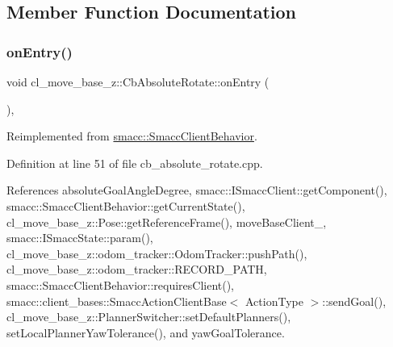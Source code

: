 \subsection{Member Function Documentation}
\mbox{\label{classcl__move__base__z_1_1CbAbsoluteRotate_a10418ea360809fa649d295716b152b2b}} 
\subsubsection{\texorpdfstring{on\+Entry()}{onEntry()}}
{\footnotesize\ttfamily void cl\+\_\+move\+\_\+base\+\_\+z\+::\+Cb\+Absolute\+Rotate\+::on\+Entry (\begin{DoxyParamCaption}{ }\end{DoxyParamCaption})\hspace{0.3cm}{\ttfamily [override]}, {\ttfamily [virtual]}}



Reimplemented from \hyperlink{classsmacc_1_1SmaccClientBehavior_a7962382f93987c720ad432fef55b123f}{smacc\+::\+Smacc\+Client\+Behavior}.



Definition at line 51 of file cb\+\_\+absolute\+\_\+rotate.\+cpp.



References absolute\+Goal\+Angle\+Degree, smacc\+::\+I\+Smacc\+Client\+::get\+Component(), smacc\+::\+Smacc\+Client\+Behavior\+::get\+Current\+State(), cl\+\_\+move\+\_\+base\+\_\+z\+::\+Pose\+::get\+Reference\+Frame(), move\+Base\+Client\+\_\+, smacc\+::\+I\+Smacc\+State\+::param(), cl\+\_\+move\+\_\+base\+\_\+z\+::odom\+\_\+tracker\+::\+Odom\+Tracker\+::push\+Path(), cl\+\_\+move\+\_\+base\+\_\+z\+::odom\+\_\+tracker\+::\+R\+E\+C\+O\+R\+D\+\_\+\+P\+A\+TH, smacc\+::\+Smacc\+Client\+Behavior\+::requires\+Client(), smacc\+::client\+\_\+bases\+::\+Smacc\+Action\+Client\+Base$<$ Action\+Type $>$\+::send\+Goal(), cl\+\_\+move\+\_\+base\+\_\+z\+::\+Planner\+Switcher\+::set\+Default\+Planners(), set\+Local\+Planner\+Yaw\+Tolerance(), and yaw\+Goal\+Tolerance.


